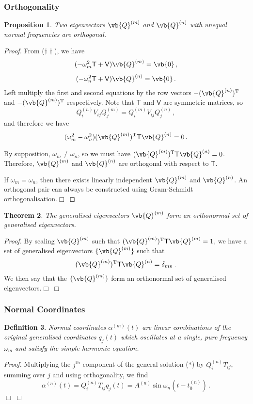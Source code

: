 \documentclass{article}
\theoremstyle{plain}\theoremheaderfont{\normalfont\itshape}\theorembodyfont{\rmfamily}\theoremseparator{.}\newtheorem*{rem}{Remark}\newtheorem*{ex}{Example}\newtheorem*{proof}{Proof}\newtheorem*{altp}{Alternative proof}
\theoremstyle{plain}\theoremheaderfont{\normalfont\bfseries}\theorembodyfont{\rmfamily}\theoremseparator{.}\newtheorem{thm}{Theorem}[section]\newtheorem{lem}[thm]{Lemma}\newtheorem{prop}[thm]{Proposition}\newtheorem*{cor}{Corollary}\newtheorem{defn}[thm]{Definition}\newtheorem{clm}[thm]{Claim}\newtheorem{clminproof}{Claim}
\theoremstyle{break}\theoremheaderfont{\normalfont\itshape}\theorembodyfont{\rmfamily}\theoremseparator{.\medskip}\newtheorem*{proofskip}{Proof}\newtheorem*{exs}{Examples}\newtheorem*{rems}{Remarks}
\theoremstyle{break}\theoremheaderfont{\normalfont\bfseries}\theorembodyfont{\rmfamily}\theoremseparator{.\medskip}\newtheorem{lemskip}[thm]{Lemma}\newtheorem{defnskip}[thm]{Definition}\newtheorem{propskip}[thm]{Proposition}\newtheorem{thmskip}[thm]{Theorem}
\numberwithin{equation}{section}
\newcommand{\qed}{\hfill\ensuremath{\Box}}
\newcommand{\tp}{^\mathrm{T}}
\begin{document}
	\subsubsection{Orthogonality}
	\begin{prop}
		Two eigenvectors \(\vb{Q}^{(m)}\) and \(\vb{Q}^{(n)}\) with unequal normal frequencies are orthogonal.
	\end{prop}
	\begin{proof}
		From (\(\dagger\dagger\)), we have
		\[(-\omega_m^2\mathsf{T}+\mathsf{V})\vb{Q}^{(m)}=\vb{0}\,,\]
		\[(-\omega_n^2\mathsf{T}+\mathsf{V})\vb{Q}^{(n)}=\vb{0}\,.\]
		Left multiply the first and second equations by the row vectors \(-(\vb{Q}^{(n)})\tp\) and \(-(\vb{Q}^{(m)})\tp\) respectively. Note that \(\mathsf{T}\) and \(\mathsf{V}\) are symmetric matrices, so
		\[Q_i^{(n)}V_{ij}Q_j^{(m)}=Q_i^{(m)}V_{ij}Q_j^{(n)}\,,\]
		and therefore we have
		\[(\omega_m^2-\omega_n^2)(\vb{Q}^{(m)})\tp\mathsf{T}\vb{Q}^{(n)}=0\,.\]

		By supposition, \(\omega_m\ne\omega_n\), so we must have \((\vb{Q}^{(m)})\tp\mathsf{T}\vb{Q}^{(n)}=0\). Therefore, \(\vb{Q}^{(m)}\) and \(\vb{Q}^{(n)}\) are orthogonal with respect to \(\mathsf{T}\).

		If \(\omega_m=\omega_n\), then there exists linearly independent \(\vb{Q}^{(m)}\) and \(\vb{Q}^{(n)}\). An orthogonal pair can always be constructed using Gram-Schmidt orthogonalisation.\qed
	\end{proof}

	\begin{thm}
		The generalised eigenvectors \(\vb{Q}^{(m)}\) form an orthonormal set of generalised eigenvectors.
	\end{thm}
	\begin{proof}
		By scaling \(\vb{Q}^{(m)}\) such that \((\vb{Q}^{(m)})\tp\mathsf{T}\vb{Q}^{(m)}=1\), we have a set of generalised eigenvectors \(\{\vb{Q}^{(m)}\}\) such that
		\[(\vb{Q}^{(m)})\tp\mathsf{T}\vb{Q}^{(n)}=\delta_{mn}\,.\]
		We then say that the \(\{\vb{Q}^{(m)}\}\) form an orthonormal set of generalised eigenvectors.\qed
	\end{proof}
	\subsubsection{Normal Coordinates}
	\begin{defn}
		\textit{Normal coordinates} \(\alpha^{(m)}(t)\) are linear combinations of the original generalised coordinates \(q_j(t)\) which oscillates at a single, pure frequency \(\omega_m\) and satisfy the simple harmonic equation.
	\end{defn}
	\begin{prop}\label[prop]{normco}
		The normal coordinates are given by
		\[\alpha^{(n)}(t)=Q_{i}^{(n)}T_{ij}q_j(t)\,.\]
	\end{prop}
	\begin{proof}
		Multiplying the \(j^\text{th}\) component of the general solution (\(*\)) by \(Q_{i}^{(n)}T_{ij}\), summing over \(j\) and using orthogonality, we find
		\[\alpha^{(n)}(t)=Q_{i}^{(n)}T_{ij}q_j(t)=A^{(n)}\sin\omega_n(t-t_0^{(n)})\,.\]\qed
	\end{proof}
\end{document}
